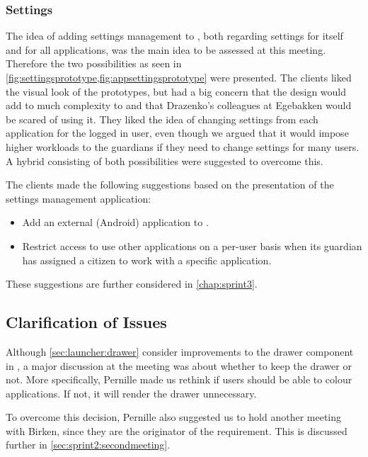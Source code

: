 \subsubsection{Settings}
The idea of adding settings management to \launcher, both regarding settings for \launcher itself and for all \giraf applications, was the main idea to be assessed at this meeting.
Therefore the two possibilities as seen in \cref{fig:settingsprototype,fig:appsettingsprototype} were presented.
The clients liked the visual look of the prototypes, but had a big concern that the design would add to much complexity to \launcher and that Drazenko's colleagues at Egebakken would be scared of using it.
They liked the idea of changing settings from each application for the logged in user, even though we argued that it would impose higher workloads to the guardians if they need to change settings for many users.
A hybrid consisting of both possibilities were suggested to overcome this.

The clients made the following suggestions based on the presentation of the settings management application:

\begin{itemize}
\item Add an external (Android) application to \launcher.
\item Restrict access to use other applications on a per-user basis when its guardian has assigned a citizen to work with a specific application.
\end{itemize}

These suggestions are further considered in \cref{chap:sprint3}.


\subsection{Clarification of Issues}
Although \cref{sec:launcher:drawer} consider improvements to the drawer component in \giraf, a major discussion at the meeting was about whether to keep the drawer or not.
More specifically, Pernille made us rethink if users should be able to colour applications.
If not, it will render the drawer unnecessary.

To overcome this decision, Pernille also suggested us to hold another meeting with Birken, since they are the originator of the requirement.
This is discussed further in \cref{sec:sprint2:secondmeeting}.

